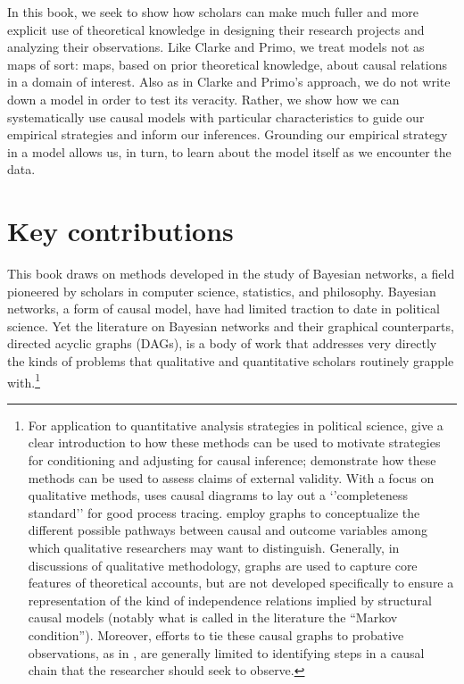 \documentclass[
  12pt,
]{book}
\begin{document}
In this book, we seek to show how scholars can make much fuller and more explicit use of theoretical knowledge in designing their research projects and analyzing their observations. Like Clarke and Primo, we treat models not as maps of sort: maps, based on prior theoretical knowledge, about causal relations in a domain of interest. Also as in Clarke and Primo's approach, we do not write down a model in order to test its veracity. Rather, we show how we can systematically use causal models with particular characteristics to guide our empirical strategies and inform our inferences. Grounding our empirical strategy in a model allows us, in turn, to learn about the model itself as we encounter the data.

\hypertarget{key-contributions}{%
\section{Key contributions}\label{key-contributions}}

This book draws on methods developed in the study of Bayesian networks, a field pioneered by scholars in computer science, statistics, and philosophy. Bayesian networks, a form of causal model, have had limited traction to date in political science. Yet the literature on Bayesian networks and their graphical counterparts, directed acyclic graphs (DAGs), is a body of work that addresses very directly the kinds of problems that qualitative and quantitative scholars routinely grapple with.\footnote{For application to quantitative analysis strategies in political science, \citet{glynn2007non} give a clear introduction to how these methods can be used to motivate strategies for conditioning and adjusting for causal inference; \citet{garcia2015graphical} demonstrate how these methods can be used to assess claims of external validity. With a focus on qualitative methods, \citet{Waldner2015completeness} uses causal diagrams to lay out a `'completeness standard'' for good process tracing. \citet{weller2014finding} employ graphs to conceptualize the different possible pathways between causal and outcome variables among which qualitative researchers may want to distinguish. Generally, in discussions of qualitative methodology, graphs are used to capture core features of theoretical accounts, but are not developed specifically to ensure a representation of the kind of independence relations implied by structural causal models (notably what is called in the literature the ``Markov condition''). Moreover, efforts to tie these causal graphs to probative observations, as in \citet{Waldner2015completeness}, are generally limited to identifying steps in a causal chain that the researcher should seek to observe.}
\end{document}
